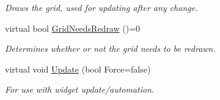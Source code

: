 \begin{DoxyCompactItemize}
\begin{DoxyCompactList}\small\item\em Draws the grid, used for updating after any change. \item\end{DoxyCompactList}\item 
\hypertarget{classphys_1_1UI_1_1CellGrid_aa4c2f8c2c5f11ce5cffa1b8a1c44d57d}{
virtual bool \hyperlink{classphys_1_1UI_1_1CellGrid_aa4c2f8c2c5f11ce5cffa1b8a1c44d57d}{GridNeedsRedraw} ()=0}
\label{d8/d59/classphys_1_1UI_1_1CellGrid_aa4c2f8c2c5f11ce5cffa1b8a1c44d57d}

\begin{DoxyCompactList}\small\item\em Determines whether or not the grid needs to be redrawn. \item\end{DoxyCompactList}\item 
\hypertarget{classphys_1_1UI_1_1CellGrid_ae72ca5a4a8924596df199c66e64c136f}{
virtual void \hyperlink{classphys_1_1UI_1_1CellGrid_ae72ca5a4a8924596df199c66e64c136f}{Update} (bool Force=false)}
\label{d8/d59/classphys_1_1UI_1_1CellGrid_ae72ca5a4a8924596df199c66e64c136f}

\begin{DoxyCompactList}\small\item\em For use with widget update/automation. \item\end{DoxyCompactList}\end{DoxyCompactItemize}
